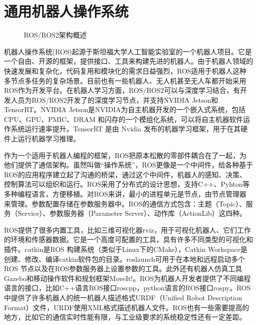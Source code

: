 \documentclass[letterpaper,10pt,english]{sphinxmanual}
\let\sphinxpxdimen\pdfpxdimen\else\newdimen\sphinxpxdimen
\begin{document}
\section{通用机器人操作系统}
\label{\detokenize{chapter_rl_sys/ros:id1}}\label{\detokenize{chapter_rl_sys/ros::doc}}
\begin{figure}[H]
\centering
\capstart

\noindent\sphinxincludegraphics[width=800\sphinxpxdimen]{{ROS2_arch}.png}
\caption{ROS/ROS2架构概述 }\label{\detokenize{chapter_rl_sys/ros:id6}}\label{\detokenize{chapter_rl_sys/ros:ros2-arch}}\end{figure}

\sphinxAtStartPar
机器人操作系统(ROS)起源于斯坦福大学人工智能实验室的一个机器人项目。它是一个自由、开源的框架，提供接口、工具来构建先进的机器人。由于机器人领域的快速发展和复杂化，代码复用和模块化的需求日益强烈，ROS适用于机器人这种多节点多任务的复杂场景。目前也有一些机器人、无人机甚至无人车都开始采用ROS作为开发平台。在机器人学习方面，ROS/ROS2可以与深度学习结合，有开发人员为ROS/ROS2开发了的深度学习节点，并支持NVIDIA
Jetson和TensorRT。NVIDIA
Jetson是NVIDIA为自主机器开发的一个嵌入式系统，包括CPU、GPU、PMIC、DRAM
和闪存的一个模组化系统，可以将自主机器软件运作系统运行速率提升。TensorRT
是由 Nvidia 发布的机器学习框架，用于在其硬件上运行机器学习推理。

\sphinxAtStartPar
作为一个适用于机器人编程的框架，ROS把原本松散的零部件耦合在了一起，为他们提供了通信架构。虽然叫做“操作系统”，ROS更像是一个中间件，给各种基于ROS的应用程序建立起了沟通的桥梁，通过这个中间件，机器人的感知、决策、控制算法可以组织和运行。ROS采用了分布式的设计思想，支持C++、Pyhton等多种编程语言，方便移植。对ROS来讲，最小的进程单元是节点，由节点管理器来管理。参数配置存储在参数服务器中。ROS的通信方式包含：主题（Topic）、服务（Service）、参数服务器（Parameter
Server）、动作库（ActionLib）这四种。

\sphinxAtStartPar
ROS提供了很多内置工具，比如三维可视化器rviz，用于可视化机器人、它们工作的环境和传感器数据。它是一个高度可配置的工具，具有许多不同类型的可视化和插件。catkin是ROS
构建系统（类似于Linux下的CMake），Catkin
Workspace是创建、修改、编译catkin软件包的目录。roslaunch可用于在本地和远程启动多个ROS
节点以及在ROS参数服务器上设置参数的工具。此外还有机器人仿真工具Gazebo和移动操作软件和规划框架MoveIt!。ROS为机器人开发者提供了不同编程语言的接口，比如C++语言ROS接口roscpp，python语言的ROS接口rospy。ROS中提供了许多机器人的统一机器人描述格式URDF（Unified
Robot Description
Format）文件，URDF使用XML格式描述机器人文件。ROS也有一些需要提高的地方，比如它的通信实时性能有限，与工业级要求的系统稳定性还有一定差距。
\end{document}
